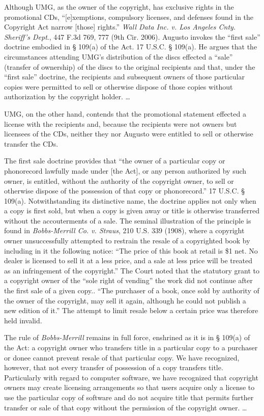 Although UMG, as the owner of the copyright, has exclusive rights in the
promotional CDs, ``[e]xemptions, compulsory licenses, and defenses found in the
Copyright Act narrow [those] rights.'' \textit{Wall Data Inc. v. Los Angeles
Cnty. Sheriff's Dept}., 447 F.3d 769, 777 (9th Cir. 2006). Augusto invokes the
``first sale'' doctrine embodied in {\S} 109(a) of the Act. 17 U.S.C. {\S}
109(a). He argues that the circumstances attending UMG's distribution of the
discs effected a ``sale'' (transfer of ownership) of the discs to the original
recipients and that, under the ``first sale'' doctrine, the recipients and
subsequent owners of those particular copies were permitted to sell or
otherwise dispose of those copies without authorization by the copyright
holder. {\dots}

UMG, on the other hand, contends that the promotional statement effected a
license with the recipients and, because the recipients were not owners but
licensees of the CDs, neither they nor Augusto were entitled to sell or
otherwise transfer the CDs.

The first sale doctrine provides that ``the owner of a particular copy or
phonorecord lawfully made under [the Act], or any person authorized by such
owner, is entitled, without the authority of the copyright owner, to sell or
otherwise dispose of the possession of that copy or phonorecord.'' 17 U.S.C.
{\S} 109(a). Notwithstanding its distinctive name, the doctrine applies not
only when a copy is first sold, but when a copy is given away or title is
otherwise transferred without the accouterments of a sale. The seminal
illustration of the principle is found in \textit{Bobbs-Merrill Co. v. Straus},
210 U.S. 339 (1908), where a copyright owner unsuccessfully attempted to
restrain the resale of a copyrighted book by including in it the following
notice: ``The price of this book at retail is \$1 net. No dealer is licensed to
sell it at a less price, and a sale at less price will be treated as an
infringement of the copyright.'' The Court noted that the statutory grant to a
copyright owner of the ``sole right of vending'' the work did not continue
after the first sale of a given copy.. ``The purchaser of a book, once sold by
authority of the owner of the copyright, may sell it again, although he could
not publish a new edition of it.'' The attempt to limit resale below a certain
price was therefore held invalid.

The rule of \textit{Bobbs-Merrill} remains in full force, enshrined as it is in
{\S} 109(a) of the Act: a copyright owner who transfers title in a particular
copy to a purchaser or donee cannot prevent resale of that particular copy. We
have recognized, however, that not every transfer of possession of a copy
transfers title. Particularly with regard to computer software, we have
recognized that copyright owners may create licensing arrangements so that
users acquire only a license to use the particular copy of software and do not
acquire title that permits further transfer or sale of that copy without the
permission of the copyright owner.  {\dots}

